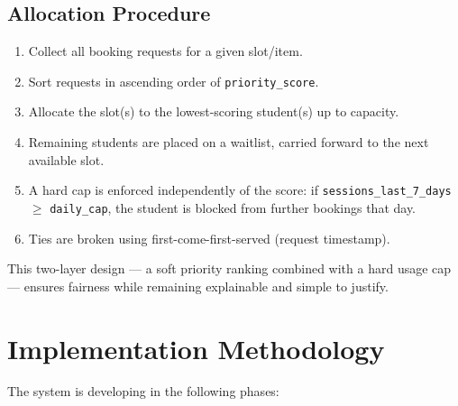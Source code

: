 \documentclass{article}
\begin{document}
\subsection{Allocation Procedure}
\begin{enumerate}
    \item Collect all booking requests for a given slot/item.
    \item Sort requests in ascending order of \texttt{priority\_score}.
    \item Allocate the slot(s) to the lowest-scoring student(s) up to capacity.
    \item Remaining students are placed on a waitlist, carried forward to the next available slot.
    \item A hard cap is enforced independently of the score: if \texttt{sessions\_last\_7\_days} $\geq$ \texttt{daily\_cap}, the student is blocked from further bookings that day.
    \item Ties are broken using first-come-first-served (request timestamp).
\end{enumerate}
This two-layer design — a soft priority ranking combined with a hard usage cap — ensures fairness while remaining explainable and simple to justify.

\section{Implementation Methodology}
The system is developing in the following phases:
\end{document}

